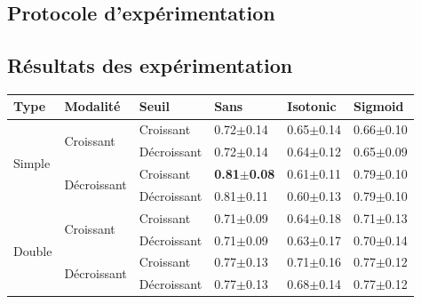 \subsection{Protocole d’expérimentation}
\subsection{Résultats des expérimentation}

\begin{table}[H]
    \begin{tabular}{llllll}
        \toprule 
        Type                    & Modalité                          & Seuil             & Sans                  & Isotonic              & Sigmoid               \\ \midrule
        \multirow{4}{*}{Simple} & \multirow{2}{*}{Croissant}        & Croissant         & 0.72$\pm$0.14         & 0.65$\pm$0.14         & 0.66$\pm$0.10         \\ \cline{3-6}
                                &                                   & Décroissant       & 0.72$\pm$0.14         & 0.64$\pm$0.12         & 0.65$\pm$0.09         \\ \cline{2-6}
                                & \multirow{2}{*}{Décroissant}      & Croissant         & \textbf{0.81$\pm$0.08}& 0.61$\pm$0.11         & 0.79$\pm$0.10         \\ \cline{3-6}
                                &                                   & Décroissant       & 0.81$\pm$0.11         & 0.60$\pm$0.13         & 0.79$\pm$0.10         \\ \cline{1-6}
        \multirow{4}{*}{Double} & \multirow{2}{*}{Croissant}        & Croissant         & 0.71$\pm$0.09         & 0.64$\pm$0.18         & 0.71$\pm$0.13         \\ \cline{3-6}
                                &                                   & Décroissant       & 0.71$\pm$0.09         & 0.63$\pm$0.17         & 0.70$\pm$0.14         \\ \cline{2-6}
                                & \multirow{2}{*}{Décroissant}      & Croissant         & 0.77$\pm$0.13         & 0.71$\pm$0.16         & 0.77$\pm$0.12         \\ \cline{3-6}
                                &                                   & Décroissant       & 0.77$\pm$0.13         & 0.68$\pm$0.14         & 0.77$\pm$0.12         \\ \bottomrule
    \end{tabular}
\end{table}

